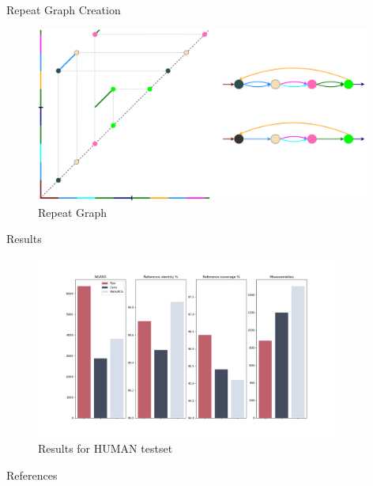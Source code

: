 \documentclass{beamer}
\begin{document}
  \begin{frame}{Repeat Graph Creation}
    \begin{figure}
      \includegraphics[width=11cm]{images/plot_to_repeat_graph.png}
      \caption{Repeat Graph}
      \label{fig:repeat_graph}
    \end{figure}
  \end{frame}

  \begin{frame}{Results}
    \begin{figure}
      \includegraphics[width=10cm]{images/results_HUMAN.png}
      \caption{Results for HUMAN testset}
      \label{fig:results}
    \end{figure}
  \end{frame}

  \appendix


  \begin{frame}[allowframebreaks]{References}

    
    
  
  \end{frame}
\end{document}
